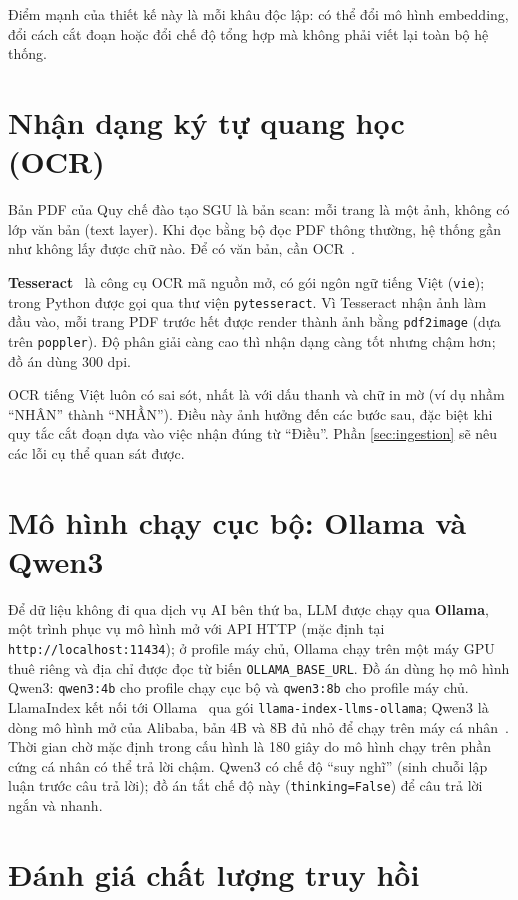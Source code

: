 Điểm mạnh của thiết kế này là mỗi khâu độc lập: có thể đổi mô hình embedding, đổi cách cắt đoạn hoặc đổi chế độ tổng hợp mà không phải viết lại toàn bộ hệ thống.

\section{Nhận dạng ký tự quang học (OCR)}

Bản PDF của Quy chế đào tạo SGU là bản scan: mỗi trang là một ảnh, không có lớp văn bản (text layer). Khi đọc bằng bộ đọc PDF thông thường, hệ thống gần như không lấy được chữ nào. Để có văn bản, cần OCR~\cite{tesseract}.

\textbf{Tesseract}~\cite{tesseract} là công cụ OCR mã nguồn mở, có gói ngôn ngữ tiếng Việt (\texttt{vie}); trong Python được gọi qua thư viện \texttt{pytesseract}. Vì Tesseract nhận ảnh làm đầu vào, mỗi trang PDF trước hết được render thành ảnh bằng \texttt{pdf2image} (dựa trên \texttt{poppler}). Độ phân giải càng cao thì nhận dạng càng tốt nhưng chậm hơn; đồ án dùng 300 dpi.

OCR tiếng Việt luôn có sai sót, nhất là với dấu thanh và chữ in mờ (ví dụ nhầm ``NHÂN'' thành ``NHẦN''). Điều này ảnh hưởng đến các bước sau, đặc biệt khi quy tắc cắt đoạn dựa vào việc nhận đúng từ ``Điều''. Phần \ref{sec:ingestion} sẽ nêu các lỗi cụ thể quan sát được.

\section{Mô hình chạy cục bộ: Ollama và Qwen3}

Để dữ liệu không đi qua dịch vụ AI bên thứ ba, LLM được chạy qua \textbf{Ollama}, một trình phục vụ mô hình mở với API HTTP (mặc định tại \texttt{http://localhost:11434}); ở profile máy chủ, Ollama chạy trên một máy GPU thuê riêng và địa chỉ được đọc từ biến \texttt{OLLAMA\_BASE\_URL}. Đồ án dùng họ mô hình Qwen3: \texttt{qwen3:4b} cho profile chạy cục bộ và \texttt{qwen3:8b} cho profile máy chủ. LlamaIndex kết nối tới Ollama~\cite{ollama} qua gói \texttt{llama-index-llms-ollama}; Qwen3 là dòng mô hình mở của Alibaba, bản 4B và 8B đủ nhỏ để chạy trên máy cá nhân~\cite{qwen3}. Thời gian chờ mặc định trong cấu hình là 180 giây do mô hình chạy trên phần cứng cá nhân có thể trả lời chậm. Qwen3 có chế độ ``suy nghĩ'' (sinh chuỗi lập luận trước câu trả lời); đồ án tắt chế độ này (\texttt{thinking=False}) để câu trả lời ngắn và nhanh.

\section{Đánh giá chất lượng truy hồi}

